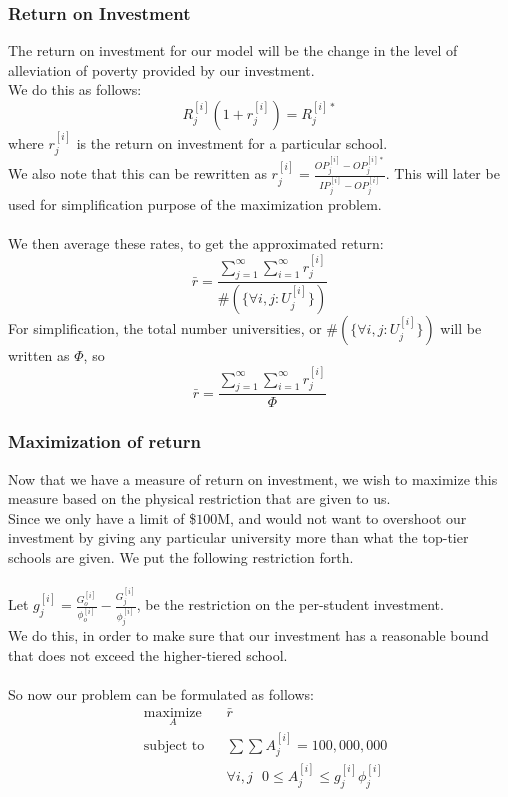 \documentclass[12pt]{scrartcl}
\begin{document}
	\subsubsection{Return on Investment}
		The return on investment for our model will be the change in the level of alleviation of poverty provided by our investment.\\
		We do this as follows:
		$$
			R_j^{[i]}(1+r_j^{[i]}) = R_j^{[i]*}
		$$
		where $r_j^{[i]}$ is the return on investment for a particular school.\\
		We also note that this can be rewritten as $r_j^{[i]} = \frac{ OP_j^{[i]} - OP_j^{[i]*}  }{ IP_j^{[i]} - OP_j^{[i]}  }$. This will later be used for simplification purpose of the maximization problem.\\
		\\
		We then average these rates, to get the approximated return:
		$$
			\bar{r} = \frac{ \sum_{j=1}^\infty\sum_{i=1}^\infty r_j^{[i]}  }{ \# (\{ \forall i, j :  U_j^{[i]} \}) }
		$$
		For simplification, the total number universities, or $\# (\{ \forall i, j :  U_j^{[i]} \})$ will be written as $\Phi$, so
		$$
			\bar{r} = \frac{ \sum_{j=1}^\infty\sum_{i=1}^\infty r_j^{[i]}  }{ \Phi }
		$$

	\subsubsection{Maximization of return}
		Now that we have a measure of return on investment, we wish to maximize this measure based on the physical restriction that are given to us.\\
		Since we only have a limit of \$$100$M, and would not want to overshoot our investment by giving any particular university more than what the top-tier schools are given. We put the following restriction forth.\\
		\\
		Let $g_j^{[i]} = \frac{  G_o^{[i]}  }{  \phi_o^{[i]} } - \frac{  G_j^{[i]}  }{  \phi_j^{[i]} } $, be the restriction on the per-student investment.\\ 
		We do this, in order to make sure that our investment has a reasonable bound that does not exceed the higher-tiered school.\\
		\\
		So now our problem can be formulated as follows:
		\begin{equation*}
				\begin{aligned}
					& \underset{A}{\text{maximize}}
					& &\bar{r}\\
					& \text{subject to}
					& & \sum \sum A_j^{[i]} = 100,000,000 \\
					&&& \forall i,j \ \ \ 0\le A_j^{[i]} \le g_j^{[i]}\phi_j^{[i]}
				\end{aligned}
		\end{equation*}
\end{document}
